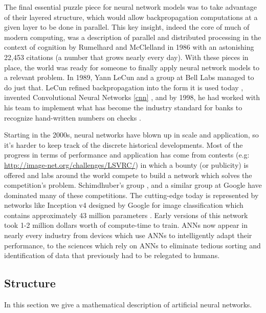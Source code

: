\documentclass[10pt]{extarticle}
\newcounter{row}
\begin{document}
The final essential puzzle piece for neural network models was to take advantage of their layered structure, which would allow backpropagation computations at a given layer to be done in parallel. This key insight, indeed the core of much of modern computing, was a description of parallel and distributed processing in the context of cognition by Rumelhard and McClelland in 1986 \cite{mcclelland1986parallel} with an astonishing 22,453 citations (a number that grows nearly every day). With these pieces in place, the world was ready for someone to finally apply neural network models to a relevant problem. In 1989, Yann LeCun and a group at Bell Labs managed to do just that. LeCun  refined backpropagation into the form it is used today \cite{lecun1989backpropagation}, invented Convolutional Neural Networks \ref{cnn} \cite{lecun1995convolutional}, and by 1998, he had worked with his team to implement what has  become the industry standard for banks to recognize hand-written numbers on checks \cite{lecun1998gradient}. 

Starting in the 2000s, neural networks have blown up in scale and application, so it's harder to keep track of the discrete historical developments. Most of the progress in terms of performance and application has come from contests (e.g: \url{http://image-net.org/challenges/LSVRC/}) in which a bounty (or publicity) is offered and labs around the world compete to build a network which solves the competition's problem. Schimdhuber's group \cite{SCHMIDHUBER201585}, and a similar group at Google have dominated many of these competitions. The cutting-edge today is represented by networks like Inception v4 designed by Google for image classification  which contains approximately 43 million parameters  \cite{Szegedy2013}. Early versions of this network took 1-2 million dollars worth of compute-time to train. ANNs now appear in nearly every industry from devices which use ANNs to intelligently adapt their performance, to the sciences which rely on ANNs to eliminate tedious sorting and identification of data that previously had to be relegated to humans.

\subsection{Structure}
In this section we give a mathematical description of artificial neural networks. 
\end{document}
